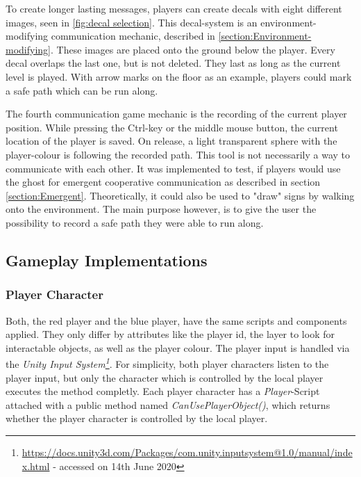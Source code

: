 To create longer lasting messages, players can create decals with eight different images, seen in \ref{fig:decal selection}. This decal-system is an environment-modifying communication mechanic, described in \ref{section:Environment-modifying}. These images are placed onto the ground below the player. Every decal overlaps the last one, but is not deleted. They last as long as the current level is played. With arrow marks on the floor as an example, players could mark a safe path which can be run along.


The fourth communication game mechanic is the recording of the current player position. While pressing the Ctrl-key or the middle mouse button, the current location of the player is saved. On release, a light transparent sphere with the player-colour is following the recorded path. This tool is not necessarily a way to communicate with each other. It was implemented to test, if players would use the ghost for emergent cooperative communication as described in section \ref{section:Emergent}. Theoretically, it could also be used to "draw" signs by walking onto the environment. The main purpose however, is to give the user the possibility to record a safe path they were able to run along.



\subsection{Gameplay Implementations}
\label{section:Gameplay implementations}


\subsubsection{Player Character}

Both, the red player and the blue player, have the same scripts and components applied. They only differ by attributes like the player id, the layer to look for interactable objects, as well as the player colour.
The player input is handled via the \textit{Unity Input System\footnote{\url{https://docs.unity3d.com/Packages/com.unity.inputsystem@1.0/manual/index.html} - accessed on 14th June 2020}}. For simplicity, both player characters listen to the player input, but only the character which is controlled by the local player executes the method completly.
Each player character has a \textit{Player}-Script attached with a public method named \textit{CanUsePlayerObject()}, which returns whether the player character is controlled by the local player.

